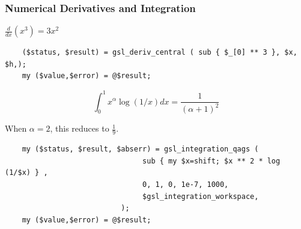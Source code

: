 \documentclass[12pt]{beamer}
\begin{document}
\begin{frame}[fragile]
    \frametitle{Numerical Derivatives and Integration}
    \begin{center}
    $ \frac{d}{dx} \left( x^3 \right) = 3 x ^2 $
        \begin{tiny}
        \begin{verbatim}
    ($status, $result) = gsl_deriv_central ( sub { $_[0] ** 3 }, $x, $h,); 
    my ($value,$error) = @$result;
        \end{verbatim}
        \end{tiny}
        \begin{tiny}
        \begin{equation*}
        \int_0^1 x^\alpha \log{\left( 1/x\right)} dx = \frac{1}{\left(\alpha+1\right)^2} 
        \end{equation*}

        When $ \alpha = 2 $, this reduces to $\frac{1}{9}$.
        \begin{verbatim}
    my ($status, $result, $abserr) = gsl_integration_qags (
                                sub { my $x=shift; $x ** 2 * log (1/$x) } , 
                                0, 1, 0, 1e-7, 1000,
                                $gsl_integration_workspace, 
                           );
    my ($value,$error) = @$result;
        \end{verbatim}
        \end{tiny}
  \end{center}
\end{frame}
\end{document}
